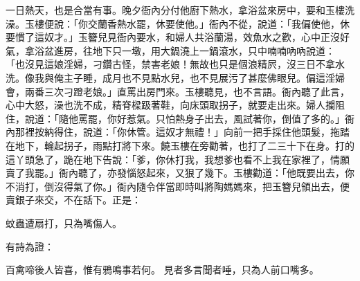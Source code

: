 一日熱天，也是合當有事。晚夕衙內分付他廚下熱水，拿浴盆來房中，要和玉樓洗澡。玉樓便說：「你交蘭香熱水罷，休要使他。」衙內不從，說道：「我偏使他，休要慣了這奴才。」玉簪兒見衙內要水，和婦人共浴蘭湯，效魚水之歡，心中正沒好氣，拿浴盆進房，往地下只一墩，用大鍋澆上一鍋滾水，只中喃喃吶吶說道： 「也沒見這娘淫婦，刁鑽古怪，禁害老娘！無故也只是個浪精屄，沒三日不拿水洗。像我與俺主子睡，成月也不見點水兒，也不見展污了甚麼佛眼兒。偏這淫婦會，兩番三次刁蹬老娘。」直罵出房門來。玉樓聽見，也不言語。衙內聽了此言，心中大怒，澡也洗不成，精脊樑趿著鞋，向床頭取拐子，就要走出來。婦人攔阻住，說道：「隨他罵罷，你好惹氣。只怕熱身子出去，風試著你，倒值了多的。」衙內那裡按納得住，說道：「你休管。這奴才無禮！」向前一把手採住他頭髮，拖踏在地下，輪起拐子，雨點打將下來。饒玉樓在旁勸著，也打了二三十下在身。打的這丫頭急了，跪在地下告說：「爹，你休打我，我想爹也看不上我在家裡了，情願賣了我罷。」衙內聽了，亦發惱怒起來，又狠了幾下。玉樓勸道：「他既要出去，你不消打，倒沒得氣了你。」衙內隨令伴當即時叫將陶媽媽來，把玉簪兒領出去，便賣銀子來交，不在話下。正是：

蚊蟲遭扇打，只為嘴傷人。

有詩為證：

百禽啼後人皆喜，惟有鴉鳴事若何。
見者多言聞者唾，只為人前口嘴多。

